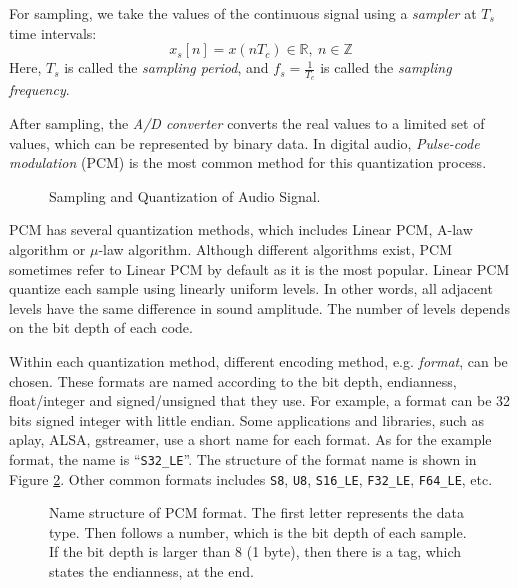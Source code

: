 \documentclass[11pt,a4paper]{report}
\begin{document}
For sampling, we take the values of the continuous signal using a \textit{sampler} at $T_s$ time intervals: \[ x_s[n] = x(n T_c) \in \mathbb{R},~ n \in \mathbb{Z} \] Here, $T_s$ is called the \textit{sampling period}, and $ f_s = \frac{1}{T_c} $ is called the \textit{sampling frequency}.

After sampling, the \textit{A/D converter} converts the real values to a limited set of values, which can be represented by binary data. In digital audio, \textit{Pulse-code modulation} (PCM) is the most common method for this quantization process. 

\begin{figure}[htbp]
  \centering
  
  \caption{Sampling and Quantization of Audio Signal.}
  \label{fig:sqas}
\end{figure}

PCM has several quantization methods, which includes Linear PCM, A-law algorithm or $\mu$-law algorithm. Although different algorithms exist, PCM sometimes refer to Linear PCM by default as it is the most popular. Linear PCM quantize each sample using linearly uniform levels. In other words, all adjacent levels have the same difference in sound amplitude. The number of levels depends on the bit depth of each code.

Within each quantization method, different encoding method, e.g. \textit{format}, can be chosen. These formats are named according to the bit depth, endianness, float/integer and signed/unsigned that they use. For example, a format can be 32 bits signed integer with little endian. Some applications and libraries, such as aplay, ALSA, gstreamer, use a short name for each format. As for the example format, the name is ``\texttt{S32\_LE}''. The structure of the format name is shown in Figure \ref{fig:pcmname}. Other common formats includes \texttt{S8}, \texttt{U8}, \texttt{S16\_LE}, \texttt{F32\_LE}, \texttt{F64\_LE}, etc.

\begin{figure}[htpb]
\begin{center}
\end{center}
\caption[Name structure of PCM format.]{Name structure of PCM format. The first letter represents the data type. Then follows a number, which is the bit depth of each sample. If the bit depth is larger than 8 (1 byte), then there is a tag, which states the endianness, at the end.}
  \label{fig:pcmname}
\end{figure}
\end{document}
